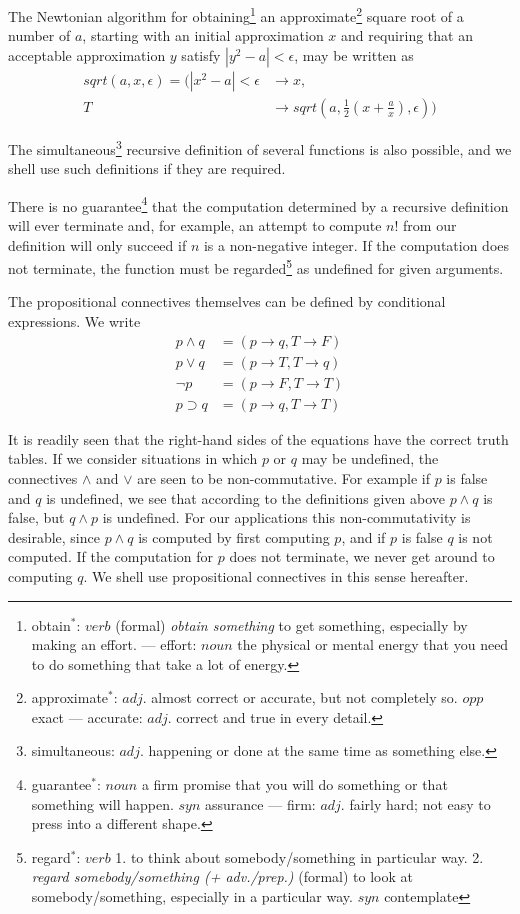 \documentclass[11pt, a4paper]{article}
\begin{document}
The Newtonian algorithm for
obtaining\footnote{obtain$^*$: $verb$ (formal) \textit{obtain something} to get
  something, especially by making an effort. --- effort: $noun$ the physical or
  mental energy that you need to do something that take a lot of energy.}
an
approximate\footnote{approximate$^*$: $adj.$ almost correct or accurate, but not
  completely so. $opp$ exact --- accurate: $adj.$ correct and true in every detail.}
square root of a number of
$a$, starting with an initial approximation $x$ and requiring that an acceptable
approximation $y$ satisfy $|y^2 - a| < \epsilon$, may be written as
\begin{align*}
  sqrt(a, x, \epsilon) =
  (|x^2 - a| < \epsilon &\to x, \\
                      T &\to sqrt(a, \frac{1}{2}(x + \frac{a}{x}), \epsilon))
\end{align*}

The
simultaneous\footnote{simultaneous: $adj.$ happening or done at the same time as
  something else.}
recursive definition of several functions is also possible, and
we shell use such definitions if they are required.

There is no
guarantee\footnote{guarantee$^*$: $noun$ a firm promise that you will do
  something or that something will happen. $syn$ assurance --- firm: $adj.$ fairly
  hard; not easy to press into a different shape.}
that the computation determined by a recursive definition
will ever terminate and, for example, an attempt to compute $n!$ from our
definition will only succeed if $n$ is a non-negative integer. If the
computation does not terminate, the function must be
regarded\footnote{regard$^*$: $verb$ 1. to think about somebody/something in
  particular way. 2. \textit{regard somebody/something (+ adv./prep.)} (formal)
  to look at somebody/something, especially in a particular way. $syn$
  contemplate}
as undefined for
given arguments.

The propositional connectives themselves can be defined by conditional
expressions. We write
\begin{align*}
    p \land q &= (p \to q, T \to F) \\
     p \lor q &= (p \to T, T \to q) \\
      \lnot p &= (p \to F, T \to T) \\
  p \supset q &= (p \to q, T \to T)
\end{align*}

It is readily seen that the right-hand sides of the equations have the correct
truth tables. If we consider situations in which $p$ or $q$ may be undefined,
the connectives $\land$ and $\lor$ are seen to be non-commutative. For example
if $p$ is false and $q$ is undefined, we see that according to the definitions
given above $p \land q$ is false, but $q \land p$ is undefined. For our
applications this non-commutativity is desirable, since $p \land q$ is computed
by first computing $p$, and if $p$ is false $q$ is not computed. If the
computation for $p$ does not terminate, we never get around to computing $q$. We
shell use propositional connectives in this sense hereafter.
\end{document}
